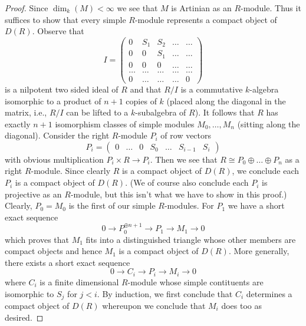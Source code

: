\begin{proof}
\medskip\noindent
Since $\dim_k(M) < \infty$ we see that $M$ is Artinian as an $R$-module.
Thus it suffices to show that every simple $R$-module represents a
compact object of $D(R)$. Observe that
$$
I =
\left(
\begin{matrix}
0 & S_1 & S_2 & \ldots & \ldots \\
0 & 0 & S_1 & \ldots & \ldots\\
0 & 0 & 0 & \ldots & \ldots \\
\ldots & \ldots & \ldots & \ldots & \ldots \\
0 & \ldots & \ldots & \ldots & 0
\end{matrix}
\right)
$$
is a nilpotent two sided ideal of $R$ and that $R/I$
is a commutative $k$-algebra isomorphic to a product of $n + 1$ copies of
$k$ (placed along the diagonal in the matrix, i.e., $R/I$ can be lifted
to a $k$-subalgebra of $R$). It follows that $R$ has exactly $n + 1$
isomorphism classes of simple modules $M_0, \ldots, M_n$ (sitting along
the diagonal). Consider the right $R$-module $P_i$ of row vectors
$$
P_i =
\left(
\begin{matrix}
0 &
\ldots &
0 &
S_0 &
\ldots &
S_{i - 1} &
S_i
\end{matrix}
\right)
$$
with obvious multiplication $P_i \times R \to P_i$. Then we see that
$R \cong P_0 \oplus \ldots \oplus P_n$ as a right $R$-module. Since clearly
$R$ is a compact object of $D(R)$, we conclude each $P_i$ is a compact
object of $D(R)$. (We of course also conclude each $P_i$ is projective
as an $R$-module, but this isn't what we have to show in this proof.)
Clearly, $P_0 = M_0$ is the first of our simple $R$-modules.
For $P_1$ we have a short exact sequence
$$
0 \to P_0^{\oplus n + 1} \to P_1 \to M_1 \to 0
$$
which proves that $M_1$ fits into a distinguished triangle whose
other members are compact objects and hence $M_1$ is a compact
object of $D(R)$. More generally, there exists a short exact sequence
$$
0 \to C_i \to P_i \to M_i \to 0
$$
where $C_i$ is a finite dimensional $R$-module whose simple contituents
are isomorphic to $S_j$ for $j < i$. By induction, we first conclude that
$C_i$ determines a compact object of $D(R)$ whereupon we conclude that $M_i$
does too as desired.
\end{proof}

